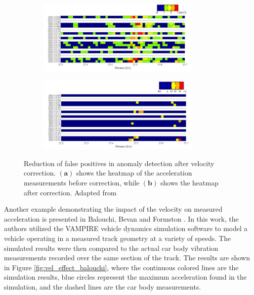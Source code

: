 \begin{figure}[H]
    \centering
    \begin{subfigure}{0.45\textwidth}
        \includegraphics[width=8cm]{Cap2_LitReview/Vel_effect/before_correction.png}
        \caption{}
        \label{fig:vel_correction_ono-a}
    \end{subfigure}
    \hspace{0.3cm}
    \begin{subfigure}{0.45\textwidth}
        \includegraphics[width=8cm]{Cap2_LitReview/Vel_effect/after_correction.png}
        \caption{}
        \label{fig:vel_correction_ono-b}
    \end{subfigure}
    \caption{Reduction of false positives in anomaly detection after velocity correction. $\boldsymbol{(a)}$ shows the heatmap of the acceleration measurements before correction, while $\boldsymbol{(b)}$ shows the heatmap after correction. Adapted from \cite{Hironori_ONO202322-00239}}
    \label{fig:vel_correction_ono}
\end{figure}

Another example demonstrating the impact of the velocity on measured acceleration is presented in Balouchi, Bevan and Formston \cite{Balouchi02092021}. In this work, the authors utilized the VAMPIRE vehicle dynamics simulation software to model a vehicle operating in a measured track geometry at a variety of speeds. The simulated results were then compared to the actual car body vibration measurements recorded over the same section of the track. The results are shown in Figure \ref{fig:vel_effect_balouchi}, where the continuous colored lines are the simulation results, blue circles represent the maximum acceleration found in the simulation, and the dashed lines are the car body measurements. 

